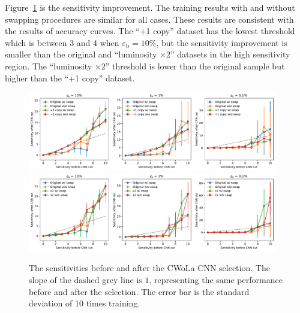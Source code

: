 \documentclass[12pt]{article}
\begin{document}
		Figure~\ref{fig:sensitivity_improvement_bkg_eff_no_swap} is the sensitivity improvement. The training results with and without swapping procedures are similar for all cases. These results are consistent with the results of accuracy curves. The ``+1 copy'' dataset has the lowest threshold which is between 3 and 4 when $\varepsilon_{\text{b}} = 10\%$, but the sensitivity improvement is smaller than the original and ``luminosity $\times 2$'' datasets in the high sensitivity region. The ``luminosity $\times 2$'' threshold is lower than the original sample but higher than the ``+1 copy'' dataset.
		\begin{figure}[htpb]
			\centering
			\includegraphics[width=0.97\textwidth]{HVmodel_sensitivity_improvement_bkg_eff_copy_1_no_swap.pdf}
			\includegraphics[width=0.97\textwidth]{HVmodel_sensitivity_improvement_bkg_eff_x2_no_swap.pdf}
			\caption{The sensitivities before and after the CWoLa CNN selection. The slope of the dashed grey line is $1$, representing the same performance before and after the selection. The error bar is the standard deviation of 10 times training.}
			\label{fig:sensitivity_improvement_bkg_eff_no_swap}
		\end{figure}
\end{document}

